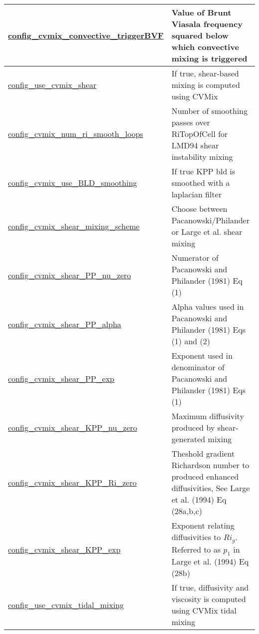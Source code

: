 {\begin{center}
\begin{longtable}{| p{2.0in} || p{4.0in} |}
    \hline
    \hyperref[subsec:nm_sec_config_cvmix_convective_triggerBVF]{config\_cvmix\_convective\_trigger\-BVF} & Value of Brunt Viasala frequency squared below which convective mixing is triggered \\
    \hline
    \hyperref[subsec:nm_sec_config_use_cvmix_shear]{config\_use\_cvmix\_shear} & If true, shear-based mixing is computed using CVMix \\
    \hline
    \hyperref[subsec:nm_sec_config_cvmix_num_ri_smooth_loops]{config\_cvmix\_num\_ri\_smooth\_\-loops} & Number of smoothing passes over RiTopOfCell for LMD94 shear instability mixing \\
    \hline
    \hyperref[subsec:nm_sec_config_cvmix_use_BLD_smoothing]{config\_cvmix\_use\_BLD\_\-smoothing} & If true KPP bld is smoothed with a laplacian filter \\
    \hline
    \hyperref[subsec:nm_sec_config_cvmix_shear_mixing_scheme]{config\_cvmix\_shear\_mixing\_\-scheme} & Choose between Pacanowski/Philander or Large et al. shear mixing \\
    \hline
    \hyperref[subsec:nm_sec_config_cvmix_shear_PP_nu_zero]{config\_cvmix\_shear\_PP\_nu\_\-zero} & Numerator of Pacanowski and Philander (1981) Eq (1) \\
    \hline
    \hyperref[subsec:nm_sec_config_cvmix_shear_PP_alpha]{config\_cvmix\_shear\_PP\_alpha} & Alpha values used in Pacanowski and Philander (1981) Eqs (1) and (2) \\
    \hline
    \hyperref[subsec:nm_sec_config_cvmix_shear_PP_exp]{config\_cvmix\_shear\_PP\_exp} & Exponent used in denominator of Pacanowski and Philander (1981) Eqs (1) \\
    \hline
    \hyperref[subsec:nm_sec_config_cvmix_shear_KPP_nu_zero]{config\_cvmix\_shear\_KPP\_nu\_\-zero} & Maximum diffusivity produced by shear-generated mixing \\
    \hline
    \hyperref[subsec:nm_sec_config_cvmix_shear_KPP_Ri_zero]{config\_cvmix\_shear\_KPP\_Ri\_\-zero} & Theshold gradient Richardson number to produced enhanced diffusivities, See Large et al. (1994) Eq (28a,b,c) \\
    \hline
    \hyperref[subsec:nm_sec_config_cvmix_shear_KPP_exp]{config\_cvmix\_shear\_KPP\_exp} & Exponent relating diffusivities to $Ri_g$. Referred to as $p_1$ in Large et al. (1994) Eq (28b) \\
    \hline
    \hyperref[subsec:nm_sec_config_use_cvmix_tidal_mixing]{config\_use\_cvmix\_tidal\_mixing} & If true, diffusivity and viscosity is computed using CVMix tidal mixing \\

\end{longtable}
\end{center}}
